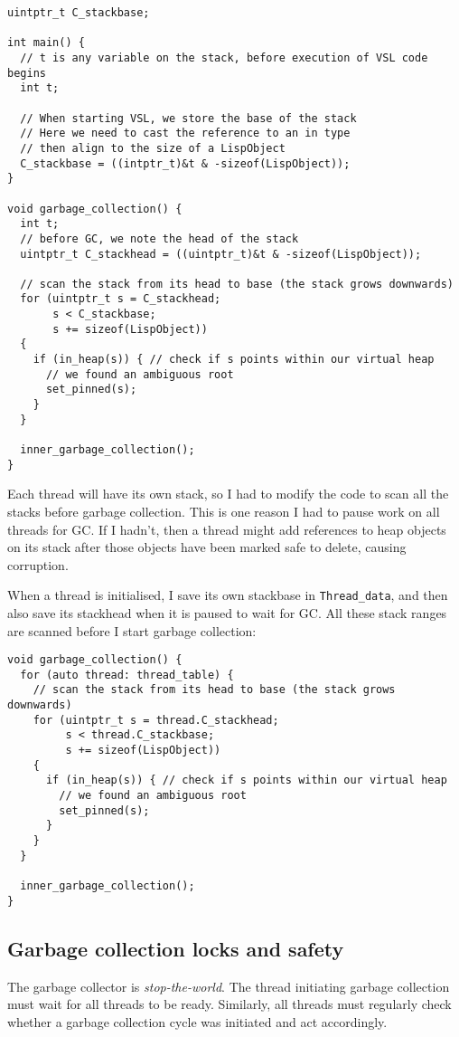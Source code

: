 \begin{verbatim}
uintptr_t C_stackbase;

int main() {
  // t is any variable on the stack, before execution of VSL code begins
  int t;

  // When starting VSL, we store the base of the stack
  // Here we need to cast the reference to an in type
  // then align to the size of a LispObject
  C_stackbase = ((intptr_t)&t & -sizeof(LispObject));
}

void garbage_collection() {
  int t;
  // before GC, we note the head of the stack
  uintptr_t C_stackhead = ((uintptr_t)&t & -sizeof(LispObject));

  // scan the stack from its head to base (the stack grows downwards)
  for (uintptr_t s = C_stackhead;
       s < C_stackbase;
       s += sizeof(LispObject))
  {
    if (in_heap(s)) { // check if s points within our virtual heap
      // we found an ambiguous root
      set_pinned(s);
    }
  }

  inner_garbage_collection();
}
\end{verbatim}

Each thread will have its own stack, so I had to modify the code to scan all the stacks before garbage
collection. This is one reason I had to pause work on all threads for GC. If I hadn't, then a thread might
add references to heap objects on its stack after those objects have been marked safe to delete, causing corruption.

When a thread is initialised, I save its own stackbase in \texttt{Thread\_data}, and then also save its stackhead
when it is paused to wait for GC. All these stack ranges are scanned before I start garbage collection:

\begin{verbatim}
void garbage_collection() {
  for (auto thread: thread_table) {
    // scan the stack from its head to base (the stack grows downwards)
    for (uintptr_t s = thread.C_stackhead;
         s < thread.C_stackbase;
         s += sizeof(LispObject))
    {
      if (in_heap(s)) { // check if s points within our virtual heap
        // we found an ambiguous root
        set_pinned(s);
      }
    }
  }

  inner_garbage_collection();
}
\end{verbatim}

\subsection{Garbage collection locks and safety}
\label{sec:gclock}
The garbage collector is \emph{stop-the-world}. The thread initiating garbage collection must wait for all
threads to be ready. Similarly, all threads must regularly check whether a garbage collection cycle was
initiated and act accordingly.

